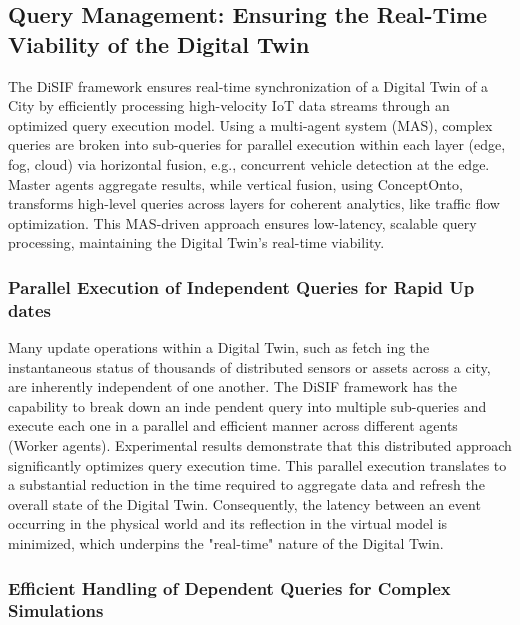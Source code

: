 \documentclass[5p,times]{elsarticle}
\begin{document}
\subsection{Query Management: Ensuring the Real-Time Viability of the Digital Twin}

The DiSIF framework ensures real-time synchronization of a Digital Twin of a 
City by efficiently processing high-velocity IoT data streams through an
 optimized query execution model. Using a multi-agent system (MAS), complex 
 queries are broken into sub-queries for parallel execution within each layer
  (edge, fog, cloud) via horizontal fusion, e.g., concurrent vehicle detection
   at the edge. Master agents aggregate results, while vertical fusion, using ConceptOnto,
    transforms high-level queries across layers for coherent analytics, like traffic
     flow optimization. This MAS-driven approach ensures low-latency, scalable query
      processing, maintaining the Digital Twin's real-time viability.

\subsubsection{ Parallel Execution of Independent Queries for Rapid Up dates}

Many update operations within a Digital Twin, such as fetch
ing the instantaneous status of thousands of distributed sensors
 or assets across a city, are inherently independent of one another.
 The DiSIF framework has the capability to break down an inde
pendent query into multiple sub-queries and execute each one in
 a parallel and efficient manner across different agents (Worker
 agents). Experimental results demonstrate that this distributed
 approach significantly optimizes query execution time.
 This parallel execution translates to a substantial reduction
 in the time required to aggregate data and refresh the overall
 state of the Digital Twin. Consequently, the latency between
 an event occurring in the physical world and its reflection in
 the virtual model is minimized, which underpins the "real-time"
 nature of the Digital Twin.


 \subsubsection{ Efficient Handling of Dependent Queries for Complex Simulations}
\end{document}
